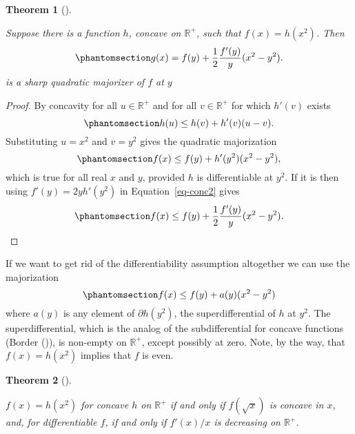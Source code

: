 \documentclass[
  12pt,
  letterpaper,
  DIV=11,
  numbers=noendperiod]{scrartcl}
\theoremstyle{definition}
\theoremstyle{definition}
\theoremstyle{plain}
\theoremstyle{plain}
\newtheorem{theorem}{Theorem}[section]
\theoremstyle{plain}
\theoremstyle{remark}
\begin{document}
\begin{theorem}[]\protect\hypertarget{thm-wght}{}\label{thm-wght}

Suppose there is a function \(h\), concave on \(\mathbb{R}^+\), such
that \(f(x)=h(x^2)\). Then
\begin{equation}\phantomsection\label{eq-given}{
g(x)=f(y)+\frac12\frac{f'(y)}{y}(x^2-y^2).
}\end{equation} is a sharp quadratic majorizer of \(f\) at \(y\)

\end{theorem}

\begin{proof}
By concavity for all \(u\in\mathbb{R}^+\) and for all
\(v\in\mathbb{R}^+\) for which \(h'(v)\) exists
\begin{equation}\phantomsection\label{eq-concave}{
h(u)\leq h(v)+h'(v)(u-v).
}\end{equation} Substituting \(u=x^2\) and \(v=y^2\) gives the quadratic
majorization \begin{equation}\phantomsection\label{eq-conc2}{
f(x)\leq f(y)+h'(y^2)(x^2-y^2),
}\end{equation} which is true for all real \(x\) and \(y\), provided
\(h\) is differentiable at \(y^2\). If it is then using
\(f'(y)=2yh'(y^2)\) in Equation~\ref{eq-conc2} gives
\begin{equation}\phantomsection\label{eq-concmaj}{
f(x)\leq f(y)+\frac12\frac{f'(y)}{y}(x^2-y^2).
}\end{equation}
\end{proof}

If we want to get rid of the differentiability assumption altogether we
can use the majorization
\begin{equation}\phantomsection\label{eq-super}{
f(x)\leq f(y)+a(y)(x^2-y^2)
}\end{equation} where \(a(y)\) is any element of \(\partial h(y^2)\),
the superdifferential of \(h\) at \(y^2\). The superdifferential, which
is the analog of the subdifferential for concave functions (Border
()), is non-empty on \(\mathbb{R}^+\),
except possibly at zero. Note, by the way, that \(f(x)=h(x^2)\) implies
that \(f\) is even.

\begin{theorem}[]\protect\hypertarget{thm-sqrt}{}\label{thm-sqrt}

\(f(x)=h(x^2)\) for concave \(h\) on \(\mathbb{R}^+\) if and only if
\(f(\sqrt{x})\) is concave in \(x\), and, for differentiable \(f\), if
and only if \(f'(x)/x\) is decreasing on \(\mathbb{R}^+\).

\end{theorem}
\end{document}
